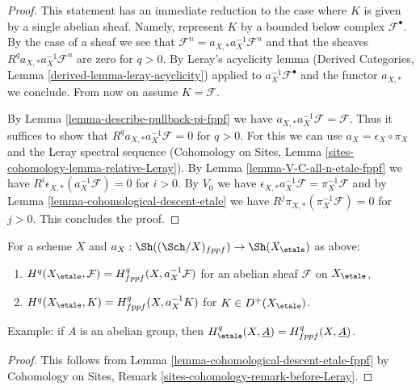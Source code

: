\begin{proof}
This statement has an immediate reduction to the case where
$K$ is given by a single abelian sheaf. Namely, represent $K$
by a bounded below complex $\mathcal{F}^\bullet$. By the case of a
sheaf we see that
$\mathcal{F}^n = a_{X, *} a_X^{-1} \mathcal{F}^n$
and that the sheaves $R^qa_{X, *}a_X^{-1}\mathcal{F}^n$
are zero for $q > 0$. By Leray's acyclicity lemma
(Derived Categories, Lemma \ref{derived-lemma-leray-acyclicity})
applied to $a_X^{-1}\mathcal{F}^\bullet$
and the functor $a_{X, *}$ we conclude. From now on assume $K = \mathcal{F}$.

\medskip\noindent
By Lemma \ref{lemma-describe-pullback-pi-fppf} we have
$a_{X, *}a_X^{-1}\mathcal{F} = \mathcal{F}$. Thus it suffices to show that
$R^qa_{X, *}a_X^{-1}\mathcal{F} = 0$ for $q > 0$.
For this we can use $a_X = \epsilon_X \circ \pi_X$ and
the Leray spectral sequence
(Cohomology on Sites, Lemma \ref{sites-cohomology-lemma-relative-Leray}).
By Lemma \ref{lemma-V-C-all-n-etale-fppf}
we have $R^i\epsilon_{X, *}(a_X^{-1}\mathcal{F}) = 0$ for $i > 0$.
By $V_0$ we have
$\epsilon_{X, *}a_X^{-1}\mathcal{F} = \pi_X^{-1}\mathcal{F}$
and by Lemma \ref{lemma-cohomological-descent-etale} we have
$R^j\pi_{X, *}(\pi_X^{-1}\mathcal{F}) = 0$ for $j > 0$.
This concludes the proof.
\end{proof}

\begin{lemma}
\label{lemma-compare-cohomology-etale-fppf}
For a scheme $X$ and $a_X : \Sh((\Sch/X)_{fppf}) \to \Sh(X_\etale)$
as above:
\begin{enumerate}
\item $H^q(X_\etale, \mathcal{F}) = H^q_{fppf}(X, a_X^{-1}\mathcal{F})$
for an abelian sheaf $\mathcal{F}$ on $X_\etale$,
\item $H^q(X_\etale, K) = H^q_{fppf}(X, a_X^{-1}K)$ for $K \in D^+(X_\etale)$.
\end{enumerate}
Example: if $A$ is an abelian group, then
$H^q_\etale(X, \underline{A}) = H^q_{fppf}(X, \underline{A})$.
\end{lemma}

\begin{proof}
This follows from Lemma \ref{lemma-cohomological-descent-etale-fppf}
by Cohomology on Sites, Remark \ref{sites-cohomology-remark-before-Leray}.
\end{proof}







